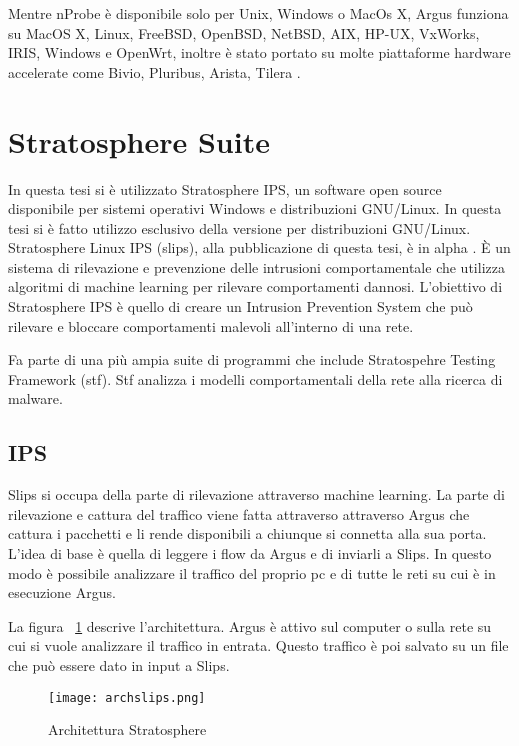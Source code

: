 \documentclass[../main.tex]{subfiles}
\begin{document}
Mentre nProbe è disponibile solo per Unix, Windows o MacOs X, Argus funziona su MacOS X, Linux, FreeBSD, OpenBSD, NetBSD, AIX, HP-UX, VxWorks, IRIS, Windows e OpenWrt, inoltre è stato portato su molte piattaforme hardware accelerate come Bivio, Pluribus, Arista, Tilera \cite{Argus}. 

\section{Stratosphere Suite}
In questa tesi si è utilizzato Stratosphere IPS, un software open source disponibile per sistemi operativi Windows e distribuzioni GNU/Linux. In questa tesi si è fatto utilizzo esclusivo della versione per distribuzioni GNU/Linux.
Stratosphere Linux IPS (slips), alla pubblicazione di questa tesi, è in alpha \cite{stratosphereSuite}. È un sistema di rilevazione e prevenzione delle intrusioni comportamentale che utilizza algoritmi di machine learning per rilevare comportamenti dannosi. 
L'obiettivo di Stratosphere IPS è quello di creare un Intrusion Prevention System che può rilevare e bloccare comportamenti malevoli all'interno di una rete.

Fa parte di una più ampia suite di programmi che include Stratospehre Testing Framework (stf). Stf analizza i modelli comportamentali della rete alla ricerca di malware.

\subsection{IPS}
Slips si occupa della parte di rilevazione attraverso machine learning. La parte di rilevazione e cattura del traffico viene fatta attraverso attraverso Argus che cattura i pacchetti e li rende disponibili a chiunque si connetta alla sua porta. L'idea di base è quella di leggere i flow da Argus e di inviarli a Slips. In questo modo è possibile analizzare il traffico del proprio pc e di tutte le reti su cui è in esecuzione Argus. 

La figura ~\ref{fig:architetturaStratosphere} descrive l'architettura. Argus è attivo sul computer o sulla rete su cui si vuole analizzare il traffico in entrata. Questo traffico è poi salvato su un file che può essere dato in input a Slips.

\begin{figure}[H]
\centering
\texttt{[image: archslips.png]}
\caption{Architettura Stratosphere}
\label{fig:architetturaStratosphere}
\end{figure}
\end{document}
